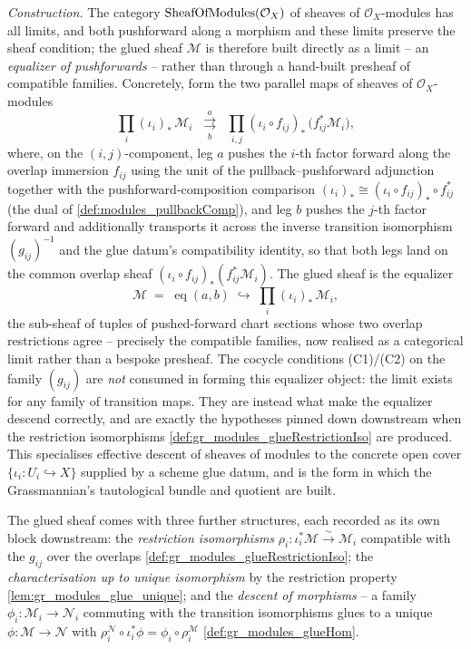 \begin{definition}
  \emph{Construction.} The category \(\mathrm{SheafOfModules}(\mathcal{O}_X)\) of sheaves of
  \(\mathcal{O}_X\)-modules has all limits, and both pushforward along a morphism and
  these limits preserve the sheaf condition; the glued sheaf \(\mathcal{M}\) is therefore
  built directly as a limit -- an \emph{equalizer of pushforwards} -- rather than through a
  hand-built presheaf of compatible families. Concretely, form the two parallel maps of
  sheaves of \(\mathcal{O}_X\)-modules
  \[
    \prod_{i} (\iota_i)_{*}\,\mathcal{M}_i
      \;\;\underset{b}{\overset{a}{\rightrightarrows}}\;\;
    \prod_{i,j} (\iota_i \circ f_{ij})_{*}\,\bigl(f_{ij}^{*}\mathcal{M}_i\bigr),
  \]
  where, on the \((i,j)\)-component, leg \(a\) pushes the \(i\)-th factor forward along the
  overlap immersion \(f_{ij}\) using the unit of the pullback--pushforward adjunction
  together with the pushforward-composition comparison
  \((\iota_i)_{*} \cong (\iota_i \circ f_{ij})_{*}\circ f_{ij}^{*}\) (the dual of
  \cref{def:modules_pullbackComp}), and leg \(b\) pushes the \(j\)-th factor forward and
  additionally transports it across the inverse transition isomorphism \((g_{ij})^{-1}\)
  and the glue datum's compatibility identity, so that both legs land on the common overlap
  sheaf \((\iota_i \circ f_{ij})_{*}(f_{ij}^{*}\mathcal{M}_i)\). The glued sheaf is the
  equalizer
  \[
    \mathcal{M} \;=\; \operatorname{eq}(a,b) \;\hookrightarrow\; \prod_{i} (\iota_i)_{*}\,\mathcal{M}_i,
  \]
  the sub-sheaf of tuples of pushed-forward chart sections whose two overlap restrictions
  agree -- precisely the compatible families, now realised as a categorical limit rather than
  a bespoke presheaf. The cocycle conditions (C1)/(C2) on the family \((g_{ij})\) are
  \emph{not} consumed in forming this equalizer object: the limit exists for any family of
  transition maps. They are instead what make the equalizer descend correctly, and are
  exactly the hypotheses pinned down downstream when the restriction isomorphisms
  \cref{def:gr_modules_glueRestrictionIso} are produced. This specialises effective descent
  of sheaves of modules to the concrete open cover \(\{\iota_i : U_i \hookrightarrow X\}\)
  supplied by a scheme glue datum, and is the form in which the Grassmannian's
  tautological bundle and quotient are built.

  The glued sheaf comes with three further structures, each recorded as its own block
  downstream: the \emph{restriction isomorphisms} \(\rho_i : \iota_i^{*}\mathcal{M}
  \xrightarrow{\sim} \mathcal{M}_i\) compatible with the \(g_{ij}\) over the overlaps
  \cref{def:gr_modules_glueRestrictionIso}; the \emph{characterisation up to unique
  isomorphism} by the restriction property \cref{lem:gr_modules_glue_unique}; and the
  \emph{descent of morphisms} -- a family \(\phi_i : \mathcal{M}_i \to \mathcal{N}_i\)
  commuting with the transition isomorphisms glues to a unique \(\phi : \mathcal{M} \to
  \mathcal{N}\) with \(\rho_i^{\mathcal{N}} \circ \iota_i^{*}\phi = \phi_i \circ
  \rho_i^{\mathcal{M}}\) \cref{def:gr_modules_glueHom}.
\end{definition}

